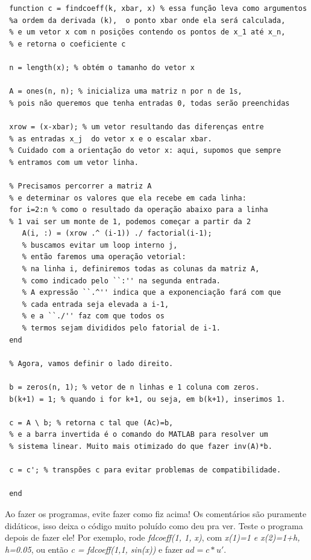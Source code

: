 \documentclass[../differential_methods.tex]{subfiles}
\begin{document}
\begin{verbatim}
 function c = findcoeff(k, xbar, x) % essa função leva como argumentos 
 %a ordem da derivada (k),  o ponto xbar onde ela será calculada,
 % e um vetor x com n posições contendo os pontos de x_1 até x_n,
 % e retorna o coeficiente c

 n = length(x); % obtém o tamanho do vetor x

 A = ones(n, n); % inicializa uma matriz n por n de 1s,   
 % pois não queremos que tenha entradas 0, todas serão preenchidas 

 xrow = (x-xbar); % um vetor resultando das diferenças entre 
 % as entradas x_j  do vetor x e o escalar xbar. 
 % Cuidado com a orientação do vetor x: aqui, supomos que sempre  
 % entramos com um vetor linha.

 % Precisamos percorrer a matriz A 
 % e determinar os valores que ela recebe em cada linha:
 for i=2:n % como o resultado da operação abaixo para a linha 
 % 1 vai ser um monte de 1, podemos começar a partir da 2
    A(i, :) = (xrow .^ (i-1)) ./ factorial(i-1); 
    % buscamos evitar um loop interno j, 
    % então faremos uma operação vetorial: 
    % na linha i, definiremos todas as colunas da matriz A, 
    % como indicado pelo ``:'' na segunda entrada. 
    % A expressão ``.^'' indica que a exponenciação fará com que
    % cada entrada seja elevada a i-1,
    % e a ``./'' faz com que todos os
    % termos sejam divididos pelo fatorial de i-1.
 end 

 % Agora, vamos definir o lado direito.

 b = zeros(n, 1); % vetor de n linhas e 1 coluna com zeros.
 b(k+1) = 1; % quando i for k+1, ou seja, em b(k+1), inserimos 1.

 c = A \ b; % retorna c tal que (Ac)=b, 
 % e a barra invertida é o comando do MATLAB para resolver um 
 % sistema linear. Muito mais otimizado do que fazer inv(A)*b.

 c = c'; % transpões c para evitar problemas de compatibilidade.
 
 end
\end{verbatim}
Ao fazer os programas, evite fazer como fiz acima! Os comentários são puramente didáticos, isso deixa o código muito poluído como deu pra ver.
Teste o programa depois de fazer ele! Por exemplo, rode \textit{fdcoeff(1, 1, x)}, com \textit{x(1)=1 e x(2)=1+h, h=0.05}, ou então \textit{c = fdcoeff(1,1, sin(x))} e fazer \(ad = c * u'\).
\end{document}

